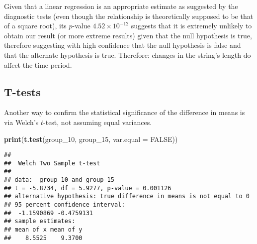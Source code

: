 \documentclass[
]{article}
\newenvironment{Shaded}{\begin{snugshade}}{\end{snugshade}}
\newcommand{\AttributeTok}[1]{\textcolor[rgb]{0.13,0.29,0.53}{#1}}
\newcommand{\ConstantTok}[1]{\textcolor[rgb]{0.56,0.35,0.01}{#1}}
\newcommand{\DecValTok}[1]{\textcolor[rgb]{0.00,0.00,0.81}{#1}}
\newcommand{\FunctionTok}[1]{\textcolor[rgb]{0.13,0.29,0.53}{\textbf{#1}}}
\newcommand{\NormalTok}[1]{#1}
\newcommand{\OtherTok}[1]{\textcolor[rgb]{0.56,0.35,0.01}{#1}}
\newcommand{\SpecialCharTok}[1]{\textcolor[rgb]{0.81,0.36,0.00}{\textbf{#1}}}
\begin{document}
Given that a linear regression is an appropriate estimate as suggested
by the diagnostic tests (even though the relationship is theoretically
supposed to be that of a square root), its \(p\)-value
\(4.52 \times 10^{-12}\) suggests that it is extremely unlikely to
obtain our result (or more extreme results) given that the null
hypothesis is true, therefore suggesting with high confidence that the
null hypothesis is false and that the alternate hypothesis is true.
Therefore: changes in the string's length do affect the time period.

\subsection{T-tests}\label{t-tests}

Another way to confirm the statistical significance of the difference in
means is via Welch's \(t\)-test, not assuming equal variances.

\begin{Shaded}
\end{Shaded}

\begin{Shaded}
\begin{Highlighting}[]
\FunctionTok{print}\NormalTok{(}\FunctionTok{t.test}\NormalTok{(group\_10, group\_15, }\AttributeTok{var.equal =} \ConstantTok{FALSE}\NormalTok{))}
\end{Highlighting}
\end{Shaded}

\begin{verbatim}
## 
##  Welch Two Sample t-test
## 
## data:  group_10 and group_15
## t = -5.8734, df = 5.9277, p-value = 0.001126
## alternative hypothesis: true difference in means is not equal to 0
## 95 percent confidence interval:
##  -1.1590869 -0.4759131
## sample estimates:
## mean of x mean of y 
##    8.5525    9.3700
\end{verbatim}
\end{document}
